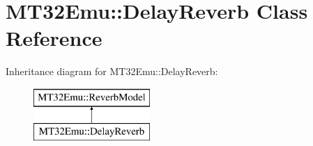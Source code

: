 \hypertarget{classMT32Emu_1_1DelayReverb}{\section{M\-T32\-Emu\-:\-:Delay\-Reverb Class Reference}
\label{classMT32Emu_1_1DelayReverb}
}
Inheritance diagram for M\-T32\-Emu\-:\-:Delay\-Reverb\-:\begin{figure}[H]
\begin{center}
\leavevmode
\includegraphics[height=2.000000cm]{classMT32Emu_1_1DelayReverb}
\end{center}
\end{figure}
